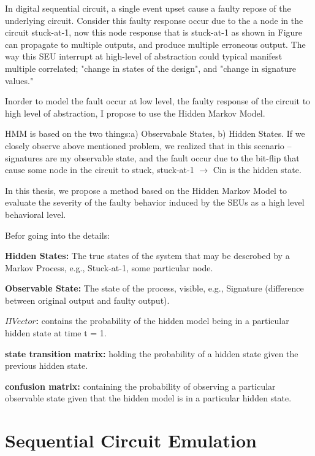In digital sequential circuit, a single event upset cause a  faulty repose of the underlying circuit. Consider this faulty response occur due to the a node in the circuit stuck-at-1, now this node response that is stuck-at-1 as shown in Figure~ can propagate to multiple outputs, and produce multiple erroneous output. The way this SEU interrupt at high-level of abstraction could typical manifest multiple correlated; "change in states of the design", and "change in signature values."

Inorder to model the fault occur at low level, the faulty response of the circuit to high level of abstraction, I propose to use the Hidden Markov Model.


HMM is based on  the two things:a) Observabale States, b) Hidden States. If we closely observe above mentioned problem, we realized that in this scenario --  signatures are my observable state, and the fault occur due to the bit-flip that cause some node in the circuit to stuck, stuck-at-1 $\rightarrow$ Cin is the hidden state.

In this thesis, we propose a method based on the Hidden Markov Model to evaluate the severity of the faulty behavior induced by the SEUs as a high level behavioral level. 


Befor going into the details:

\textbf{Hidden States:} The true states of the system that may be descrobed by a Markov Process, e.g., Stuck-at-1, some particular node.

\textbf{Observable State:} The state of the process, visible, e.g., Signature (difference between original output and faulty output).

\textbf{$\Pi Vector$:} contains the probability of the hidden model being in a particular hidden state at time t = 1.

\textbf{state transition matrix:}  holding the probability of a hidden state given the previous hidden state.

\textbf{confusion matrix:} containing the probability of observing a particular observable state given that the hidden model is in a particular hidden state. 


\section{Sequential Circuit Emulation}



